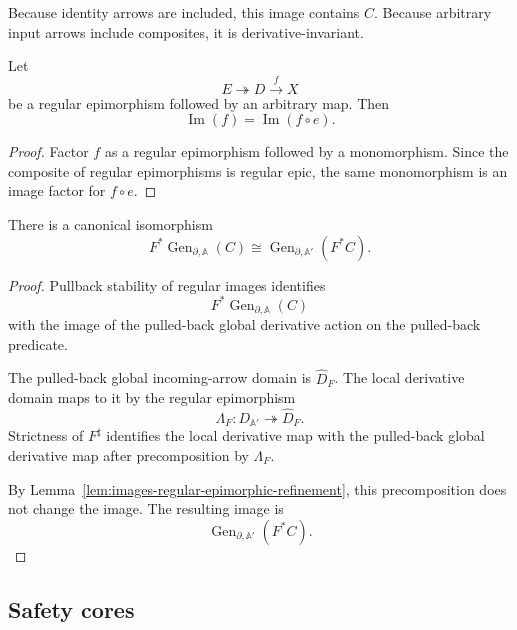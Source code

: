 Because identity arrows are included, this image contains \(C\). Because
arbitrary input arrows include composites, it is derivative-invariant.

\begin{lemma}
\label{lem:images-regular-epimorphic-refinement}
Let
\[
    E\twoheadrightarrow D\xrightarrow{f}X
\]
be a regular epimorphism followed by an arbitrary map. Then
\[
    \operatorname{Im}(f)
    =
    \operatorname{Im}(f\circ e).
\]
\end{lemma}

\begin{proof}
Factor \(f\) as a regular epimorphism followed by a monomorphism. Since the
composite of regular epimorphisms is regular epic, the same monomorphism is an
image factor for \(f\circ e\).
\end{proof}

\begin{theorem}
\label{thm:generated-closure-commutes-restriction}
There is a canonical isomorphism
\[
    F^\ast
    \operatorname{Gen}_{\partial,\mathbb A}(C)
    \cong
    \operatorname{Gen}_{\partial,\mathbb A'}
    (F^\ast C).
\]
\end{theorem}

\begin{proof}
Pullback stability of regular images identifies
\[
    F^\ast
    \operatorname{Gen}_{\partial,\mathbb A}(C)
\]
with the image of the pulled-back global derivative action on the pulled-back
predicate.

The pulled-back global incoming-arrow domain is
\(\widehat D_F\). The local derivative domain maps to it by the regular
epimorphism
\[
    \Lambda_F:
    D_{\mathbb A'}\twoheadrightarrow\widehat D_F.
\]
Strictness of \(F^\sharp\) identifies the local derivative map with the
pulled-back global derivative map after precomposition by \(\Lambda_F\).

By
Lemma~\ref{lem:images-regular-epimorphic-refinement},
this precomposition does not change the image. The resulting image is
\[
    \operatorname{Gen}_{\partial,\mathbb A'}
    (F^\ast C).
\]
\end{proof}

\subsection{Safety cores}
\label{subsec:safety-cores-restriction}

